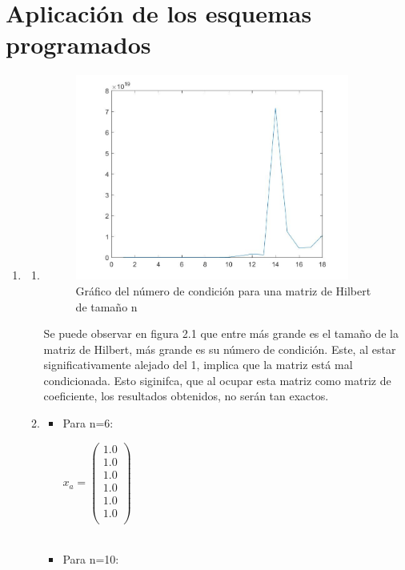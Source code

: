 \documentclass{udpreport}
\begin{document}
 \section{Aplicación de los esquemas programados}
 \begin{enumerate}
 	\item   
 		\begin{enumerate}
 			\item 	
 			\begin{figure}[H]
 				\centering
 				\includegraphics[width=9cm]{grafo1-a}
 				\caption{Gráfico del número de condición para una matriz de Hilbert de tamaño n}
 			\end{figure}
 			Se puede observar en figura 2.1 que entre más grande es el tamaño de la matriz de Hilbert, más grande es su número de condición. Este, al estar significativamente alejado del 1, implica que la matriz está mal condicionada. Esto siginifca, que al ocupar esta matriz como matriz de coeficiente, los resultados obtenidos, no serán tan exactos.  %
 			\item 
 				\begin{itemize} 				
 				\item Para n=6:
 				
 				$x_{a} = \left(\begin{array}{c} 1.0\\ 1.0\\ 1.0\\ 1.0\\ 1.0\\ 1.0\\ \end{array}\right)$
 				\\
 				\\
 				\item Para n=10:
 				

\end{itemize}
\end{enumerate}
\end{enumerate}
\end{document}
